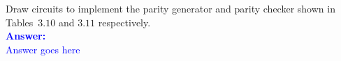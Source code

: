 \item{}
Draw circuits to implement the parity generator and parity checker shown in
Tables~$3.10$ and $3.11$ respectively.\\[12pt]
\ifanswers
\textcolor{blue}{
\textbf{Answer:}\\[12pt]
Answer goes here
}
\newpage
\fi

